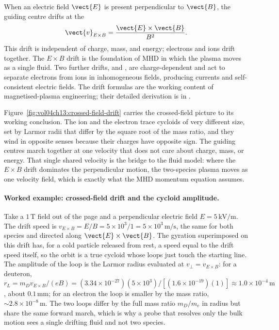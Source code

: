 When an electric field $\vect{E}$ is present perpendicular to
$\vect{B}$, the guiding centre drifts at the 
\[
\vect{v}_{E\times B} = \frac{\vect{E}\times \vect{B}}{B^{2}}.
\]
This drift is independent of charge, mass, and energy; electrons and
ions drift together. The $E\times B$ drift is the foundation of MHD
in which the plasma moves as a single fluid. Two further drifts,
 and , are
charge-dependent and act to separate electrons from ions in
inhomogeneous fields, producing currents and self-consistent
electric fields. The drift formulas are the working content of
magnetised-plasma engineering; their detailed derivation is in
\cite{text:chen-plasma-physics, text:goldston-rutherford-plasma}.



Figure~\ref{fig:vol04ch13:crossed-field-drift} carries the crossed-field
picture to its working conclusion. The ion and the electron trace cycloids
of very different size, set by Larmor radii that differ by the square root
of the mass ratio, and they wind in opposite senses because their charges
have opposite sign. The guiding centres march together at one velocity that
does not care about charge, mass, or energy. That single shared velocity is
the bridge to the fluid model: where the $E\times B$ drift dominates the
perpendicular motion, the two-species plasma moves as one velocity field,
which is exactly what the MHD momentum equation assumes.

\paragraph{Worked example: crossed-field drift and the cycloid amplitude.}
Take a $1\,\si{\tesla}$ field out of the page and a perpendicular electric
field $E = 5\,\si{\kilo\volt\per\meter}$. The drift speed is $v_{E\times B}
= E/B = 5\times 10^{3}/1 = 5\times 10^{3}\,\si{\meter\per\second}$, the same
for both species and directed along $\vect{E}\times\vect{B}$. The gyration
superimposed on this drift has, for a cold particle released from rest, a
speed equal to the drift speed itself, so the orbit is a true cycloid whose
loops just touch the starting line. The amplitude of the loop is the Larmor
radius evaluated at $v_\perp = v_{E\times B}$: for a deuteron, $r_{L} =
m_{D}v_{E\times B}/(eB) = (3.34\times 10^{-27})(5\times 10^{3})/[(1.6\times
10^{-19})(1)] \approx 1.0\times 10^{-4}\,\si{\meter}$, about
$0.1\,\si{\milli\meter}$; for an electron the loop is smaller by the mass
ratio, $\sim 2.8\times 10^{-8}\,\si{\meter}$. The two loops differ by the full
mass ratio $m_{D}/m_{e}$ in radius but share the same forward march,
which is why a probe that resolves only the bulk motion sees a single
drifting fluid and not two species.


